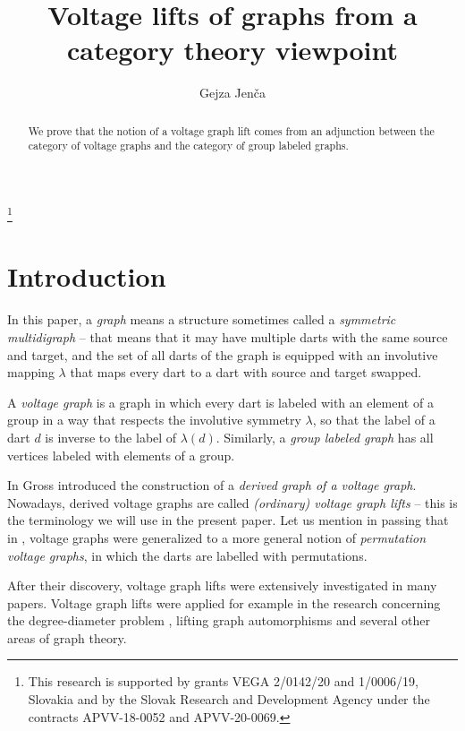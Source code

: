 \documentclass{amsart}
\theoremstyle{definition}
\begin{document}
\title{Voltage lifts of graphs from a category theory viewpoint}
\begin{abstract}
We prove that the notion of a voltage graph lift comes from an adjunction between the
category of voltage graphs and the category of group labeled graphs.
\end{abstract}

\author{Gejza Jenča}
\address{
Department of Mathematics and Descriptive Geometry\\
Faculty of Civil Engineering,
Slovak University of Technology,
	Slovak Republic
}
\thanks{
This research is supported by grants VEGA 2/0142/20 and 1/0006/19,
Slovakia and by the Slovak Research and Development Agency under the contracts
APVV-18-0052 and APVV-20-0069.
}

\maketitle

\section{Introduction}

In this paper, a {\em graph} means a structure sometimes called a 
{\em symmetric multidigraph} -- that means that it may have multiple darts
with the same source and target, and the set of all darts of the graph is equipped 
with an involutive mapping $λ$ that maps every dart to a dart
with source and target swapped.

A {\em voltage graph} is a graph in which every dart is
labeled with an element of a group in a way that respects the involutive symmetry $λ$,
so that the label of a dart $d$ is inverse to the label of $λ(d)$.
Similarly, a {\em group labeled graph} has all vertices labeled with elements of a group. 

In \cite{gross1974voltage} Gross introduced the construction of a {\em derived
graph of a voltage graph}.  Nowadays, derived voltage graphs are called {\em
(ordinary) voltage graph lifts} -- this is the terminology we will use in the
present paper. 
Let us mention in passing that in
\cite{gross1977generating}, voltage graphs were generalized to a more general
notion of {\em permutation voltage graphs}, in which the darts are labelled
with permutations.

After their discovery, voltage graph lifts were extensively investigated in
many papers. Voltage graph lifts were applied for example in the research
concerning the degree-diameter problem
\cite{brankovic1998large,brankovic1998note}, lifting graph automorphisms
\cite{malnivc2000lifting} and several other areas of graph theory.
\end{document}
